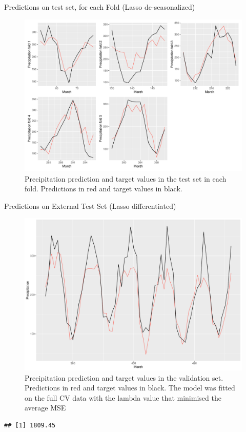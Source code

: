 \documentclass[
  ignorenonframetext,
]{beamer}
\begin{document}
\begin{frame}{Predictions on test set, for each Fold (Lasso
de-seasonalized)}
\protect\hypertarget{predictions-on-test-set-for-each-fold-lasso-de-seasonalized}{}
\begin{figure}

{\centering \includegraphics[width=0.75\linewidth]{ma-presentation_files/figure-beamer/pred-plot-fold-lasso-des-1} 

}

\caption{Precipitation prediction and target values in the test set in each fold. Predictions in red and target values in black.}\label{fig:pred-plot-fold-lasso-des}
\end{figure}
\end{frame}

\begin{frame}[fragile]{Predictions on External Test Set (Lasso
differentiated)}
\protect\hypertarget{predictions-on-external-test-set-lasso-differentiated-1}{}
\begin{figure}

{\centering \includegraphics[width=0.75\linewidth]{ma-presentation_files/figure-beamer/pred-plot-full-lasso-des-1} 

}

\caption{Precipitation prediction and target values in the validation set. Predictions in red and target values in black. The model was fitted on the full CV data with the lambda value that minimised the average MSE}\label{fig:pred-plot-full-lasso-des}
\end{figure}

\begin{verbatim}
## [1] 1809.45
\end{verbatim}
\end{frame}
\end{document}
